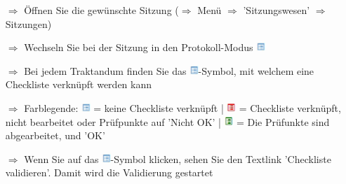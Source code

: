 \documentclass{article}
\begin{document}
\begin{multicols}{2}

\begin{tcolorbox}[colback=blue!5,colframe=blue!40!black,title=Einbindung der Checklisten beim Sitzungswesen]
\begin{itemize}
  \item[$\Longrightarrow$] Öffnen Sie die gewünschte Sitzung ($\Rightarrow$ Menü $\Rightarrow$ 'Sitzungswesen' $\Rightarrow$ Sitzungen)
  \item[$\Longrightarrow$] Wechseln Sie bei der Sitzung in den Protokoll-Modus \includegraphics[height=10pt]{Icons/Listensymbol.jpg}
	\item[$\Longrightarrow$] Bei jedem Traktandum finden Sie das \includegraphics[height=10pt]{Icons/Listensymbol.jpg}-Symbol, mit welchem eine Checkliste verknüpft werden kann
		\item[$\Longrightarrow$] Farblegende: \includegraphics[height=10pt]{Icons/Listensymbol.jpg} = keine Checkliste verknüpft | \includegraphics[height=10pt]{Icons/Liste_rot.jpg} = Checkliste verknüpft, nicht bearbeitet oder Prüfpunkte auf 'Nicht OK' | \includegraphics[height=10pt]{Icons/Liste_gruen.jpg} = Die Prüfunkte sind abgearbeitet, und 'OK'
  \item[$\Longrightarrow$] Wenn Sie auf das \includegraphics[height=10pt]{Icons/Listensymbol.jpg}-Symbol klicken, sehen Sie den Textlink 'Checkliste validieren'. Damit wird die Validierung gestartet
\end{itemize}
\end{tcolorbox}



\end{multicols}
\end{document}
